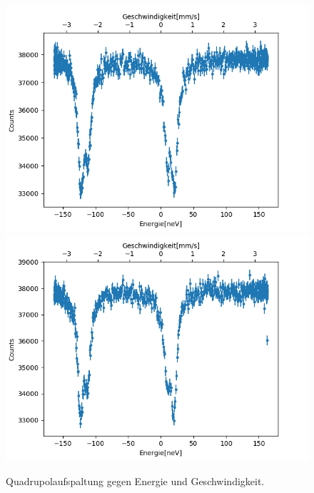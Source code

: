 \documentclass[12pt,a4paper]{article}
\begin{document}
\begin{figure}
\centering
\includegraphics[scale=0.8]{Bilder/Quadrupol/Quad_Data_vor.png}
\includegraphics[scale=0.8]{Bilder/Quadrupol/Quad_Data_nach.png}
\caption{Quadrupolaufspaltung gegen Energie und Geschwindigkeit.}
\label{fig:Quad_Data}
\end{figure}
\end{document}
